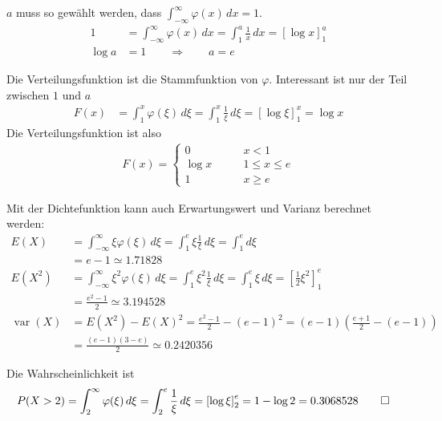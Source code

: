 \begin{loesung}
\begin{teilaufgaben}
\item
$a$ muss so gewählt werden, dass
$\int_{-\infty}^\infty  \varphi(x)\,dx=1$.
\begin{align*}
1&=
\int_{-\infty}^{\infty}\varphi(x)\,dx
=
\int_1^a \frac1x\,dx
=
\left[
\log x
\right]_1^a
\\
\log a&=1\qquad \Rightarrow \qquad a=e
\end{align*}
\item
Die Verteilungsfunktion ist die Stammfunktion von $\varphi$. Interessant ist
nur der Teil zwischen $1$ und $a$
\begin{align*}
F(x)&=\int_1^x \varphi(\xi)\,d\xi=\int_1^x\frac1{\xi}\,d\xi=\left[\log\xi\right]_1^x=\log x
\end{align*}
Die Verteilungsfunktion ist also
\begin{align*}
F(x)=\begin{cases}
0&\qquad x < 1\\
\log x&\qquad 1\le x\le e\\
1&\qquad x \ge e
\end{cases}
\end{align*}
\item
Mit der Dichtefunktion kann auch Erwartungswert und Varianz berechnet werden:
\begin{align*}
E(X)
&=
\int_{-\infty}^\infty \xi\varphi(\xi)\,d\xi
=
\int_1^e\xi\frac1\xi\,d\xi
=
\int_1^ed\xi\\
&=e-1\simeq 1.71828
\\
E(X^2)
&=
\int_{-\infty}^\infty \xi^2\varphi(\xi)\,d\xi
=
\int_1^e\xi^2\frac1\xi\,d\xi
=
\int_1^e\xi\,d\xi=\left[\frac12\xi^2\right]_1^e\\
&=\frac{e^2 -1}2
\simeq 3.194528
\\
\operatorname{var}(X)
&=
E(X^2)-E(X)^2=\frac{e^2-1}2-(e-1)^2
=
(e-1)\left(
\frac{e+1}2-(e-1)
\right)
\\
&=
\frac{(e-1)(3-e)}2
\simeq
0.2420356
\end{align*}
\item
Die Wahrscheinlichkeit ist
\begin{align*}
P(X>2)
&=
\int_2^\infty\varphi(\xi)\,d\xi =\int_2^e\frac1\xi\,d\xi=\left[\log\xi\right]_2^e
=1-\log 2=0.3068528
\qedhere
\end{align*}
\end{teilaufgaben}
\end{loesung}


